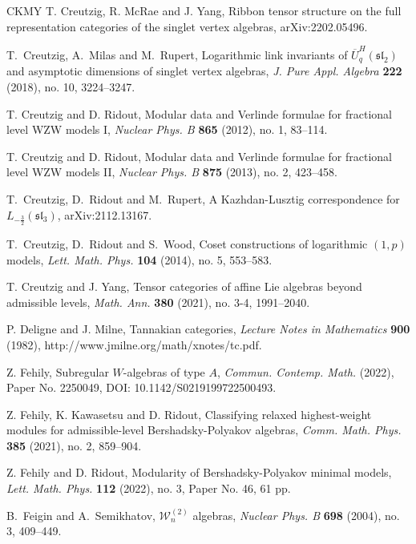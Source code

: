 \documentclass[11pt, reqno]{amsart}
\theoremstyle{definition}\newtheorem{defi}[thm]{Definition}
\theoremstyle{definition}\newtheorem{rem}[thm]{Remark}
\theoremstyle{definition}\newtheorem{exam}[thm]{Example}
\theoremstyle{definition}\newtheorem{assum}[thm]{Assumption}
\begin{document}
\begin{thebibliography}{CKMY}
T. Creutzig, R. McRae and J. Yang, Ribbon tensor structure on the full representation categories of the singlet vertex algebras, arXiv:2202.05496.

T.~Creutzig, A.~Milas and M.~Rupert, Logarithmic link invariants of $\overline{U}_q^H(\mathfrak{sl}_2)$ and asymptotic dimensions of singlet vertex algebras,
\textit{J. Pure Appl. Algebra} \textbf{222} (2018), no. 10, 3224--3247.

T. Creutzig and D. Ridout, Modular data and Verlinde formulae for fractional level WZW models I, \textit{Nuclear Phys. B} \textbf{865} (2012), no. 1, 83--114.

T. Creutzig and D. Ridout,  Modular data and Verlinde formulae for fractional level WZW models II, \textit{Nuclear Phys. B} \textbf{875} (2013), no. 2, 423--458. 

T.~Creutzig, D.~Ridout and M.~Rupert,
A Kazhdan-Lusztig correspondence for $L_{-\frac{3}{2}}(\mathfrak{sl}_3)$,
arXiv:2112.13167.

T.~Creutzig, D.~Ridout and S.~Wood, Coset constructions of logarithmic $(1,p)$ models, \textit{Lett. Math. Phys.} \textbf{104} (2014), no. 5, 553--583.

T. Creutzig and J. Yang, Tensor categories of affine Lie algebras beyond admissible levels, \textit{Math. Ann.} \textbf{380} (2021), no. 3-4, 1991--2040. 

P. Deligne and J. Milne, Tannakian categories, \textit{Lecture Notes in Mathematics} \textbf{900}
(1982), http://www.jmilne.org/math/xnotes/tc.pdf.

Z. Fehily, Subregular $W$-algebras of type $A$, \textit{Commun. Contemp. Math.} (2022), Paper No. 2250049, DOI: 10.1142/S0219199722500493.

Z. Fehily, K. Kawasetsu and D. Ridout, Classifying relaxed highest-weight modules for admissible-level Bershadsky-Polyakov algebras, \textit{Comm. Math. Phys.} \textbf{385} (2021), no. 2, 859--904.

Z. Fehily and D. Ridout, Modularity of Bershadsky-Polyakov minimal models, \textit{Lett. Math. Phys.} \textbf{112} (2022), no. 3, Paper No. 46, 61 pp.

B.~Feigin and A.~Semikhatov, $\mathcal{W}^{(2)}_n$ algebras, \textit{Nuclear Phys. B} \textbf{698} (2004), no. 3, 409--449. 


\end{thebibliography}
\end{document}
